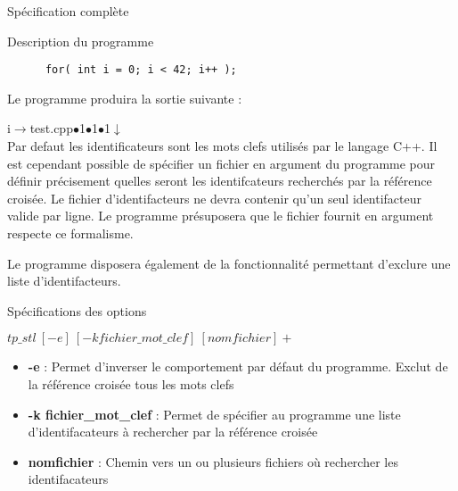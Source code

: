 \documentclass{article}
\begin{document}
\begin{section}{Spécification complète}
\begin{subsection}{Description du programme}
    \begin{verbatim}
      for( int i = 0; i < 42; i++ );
    \end{verbatim}
    Le programme produira la sortie suivante : 

    i$\xrightarrow{}$test.cpp$\bullet$1$\bullet$1$\bullet$1$\downarrow$ \\
    
    Par defaut les identificateurs sont les mots clefs utilisés par le langage C++. Il est cependant possible de spécifier
    un fichier en argument du programme pour définir précisement quelles seront les identifcateurs recherchés par la référence
    croisée. Le fichier d'identifacteurs ne devra contenir qu'un seul identifacteur valide par ligne. Le programme présuposera que
    le fichier fournit en argument respecte ce formalisme.
    
    Le programme disposera également de la fonctionnalité permettant d'exclure une liste d'identifacteurs.
    
  \end{subsection}

  
  \newpage
  \begin{subsection}{Spécifications des options}
    \begin{center}
      \textbf{$tp\_stl\ [-e]\ [-k fichier\_mot\_clef]\ [nomfichier]+$}
    \end{center}

    \begin{itemize}
      \item[] \textbf{-e} : Permet d'inverser le comportement par défaut du programme. Exclut de la référence croisée tous les mots clefs
      
      \item[] \textbf{-k fichier\_mot\_clef} : Permet de spécifier au programme une liste d'identifacateurs à rechercher par la référence croisée

      \item[] \textbf{nomfichier} : Chemin vers un ou plusieurs fichiers où rechercher les identifacateurs
    \end{itemize}

  \end{subsection}

\end{section}
\end{document}
